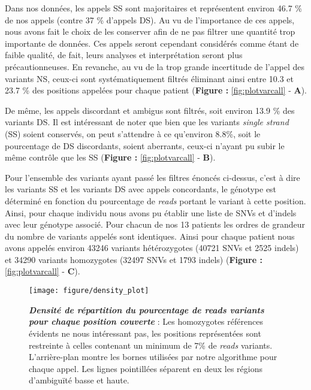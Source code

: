 \documentclass[12pt,twoside]{ugathesis}
\begin{document}
Dans nos données, les appels SS sont majoritaires et représentent
environ 46.7 \% de nos appels (contre 37 \% d'appels DS). Au vu de
l'importance de ces appels, nous avons fait le choix de les conserver
afin de ne pas filtrer une quantité trop importante de données. Ces
appels seront cependant considérés comme étant de faible qualité, de
fait, leurs analyses et interprétation seront plus précautionneuses. En
revanche, au vu de la trop grande incertitude de l'appel des variants
NS, ceux-ci sont systématiquement filtrés éliminant ainsi entre 10.3 et
23.7 \% des positions appelées pour chaque patient (\textbf{Figure :
}\ref{fig:plotvarcall} - \textbf{A}).

De même, les appels discordant et ambigus sont filtrés, soit environ
13.9 \% des variants DS. Il est intéressant de noter que bien que les
variants \emph{single strand} (SS) soient conservés, on peut s'attendre
à ce qu'environ 8.8\%, soit le pourcentage de DS discordants, soient
aberrants, ceux-ci n'ayant pu subir le même contrôle que les SS
(\textbf{Figure : }\ref{fig:plotvarcall} - \textbf{B}).

Pour l'ensemble des variants ayant passé les filtres énoncés ci-dessus,
c'est à dire les variants SS et les variants DS avec appels concordants,
le génotype est déterminé en fonction du pourcentage de \emph{reads}
portant le variant à cette position. Ainsi, pour chaque individu nous
avons pu établir une liste de SNVs et d'indels avec leur génotype
associé. Pour chacun de nos 13 patients les ordres de grandeur du nombre
de variants appelés sont identiques. Ainsi pour chaque patient nous
avons appelés environ 43246 variants hétérozygotes (40721 SNVs et 2525
indels) et 34290 variants homozygotes (32497 SNVs et 1793 indels)
(\textbf{Figure : }\ref{fig:plotvarcall} - \textbf{C}).

\newpage

\begin{figure}

{\centering \texttt{[image: figure/density\_plot]} 

}

\caption[Densité de répartition du pourcentage de *reads* variants pour chaque position couverte]{\textbf{\emph{Densité de répartition du pourcentage
de \emph{reads} variants pour chaque position couverte}} : Les
homozygotes références évidents ne nous intéressant pas, les positions
représentées sont restreinte à celles contenant un minimum de 7\% de
\emph{reads} variants. L'arrière-plan montre les bornes utilisées par
notre algorithme pour chaque appel. Les lignes pointillées séparent en
deux les régions d'ambiguïté basse et haute.}\label{fig:plotdensityvar}
\end{figure}
\end{document}
